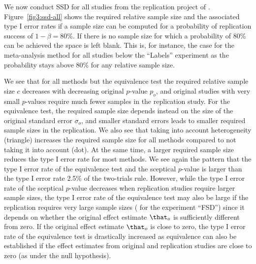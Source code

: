 We now conduct SSD for all studies from the replication project of
\citet{Protzko2020}. Figure~\ref{fig3:ssd-all} shows the required relative sample
size and the associated type I error rates if a sample size can be computed for
a probability of replication success of
$1 - \beta = 80$\%. If there is no sample size for
which a probability of $80$\% can be achieved the space
is left blank. This is, for instance, the case for the meta-analysis method for
all studies below the ``Labels'' experiment as the probability stays above
$80$\% for any relative sample size. %

We see that for all methods but the equivalence test the required relative
sample size $c$ decreases with decreasing original $p$-value $p_{o}$, and
original studies with very small $p$-values require much fewer samples in the
replication study. For the equivalence test, the required sample size depends
instead on the size of the original standard error $\sigma_{o}$, and smaller
standard errors leads to smaller required sample sizes in the
replication. %
We also see that taking into account heterogeneity (triangle) increases the
required sample size for all methods compared to not taking it into account
(dot). At the same time, a larger required sample size reduces the type I error
rate for most methods. We see again the pattern that the type I error rate of
the equivalence test and the sceptical $p$-value is larger than the type I error
rate 2.5\% of the two-trials rule. However, while the type I error rate of the
sceptical $p$-value decreases when replication studies require larger sample
sizes, the type I error rate of the equivalence test may also be large if the
replication requires very large sample sizes (\eg{} for the experiment ``FSD'')
since it depends on whether the original effect estimate $\that_{o}$ is
sufficiently different from zero. If the original effect estimate $\that_{o}$ is
close to zero, the type I error rate of the equivalence test is drastically
increased as equivalence can also be established if the effect estimates from
original and replication studies are close to zero (as under the null
hypothesis).

